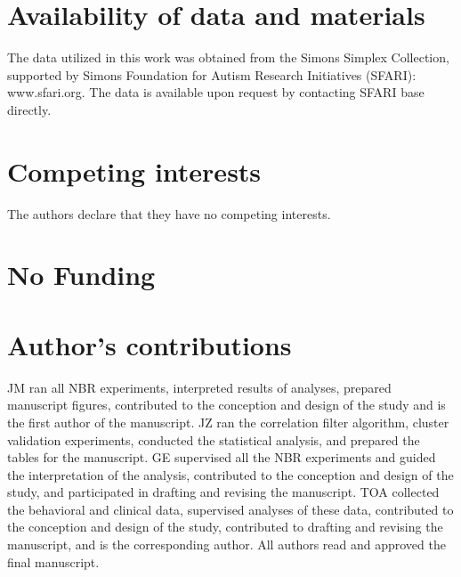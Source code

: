 \documentclass{bmcart}
\begin{document}
\begin{backmatter}
\section*{Availability of data and materials}
The data utilized in this work was obtained from the Simons Simplex Collection, supported by Simons Foundation for Autism Research Initiatives (SFARI): www.sfari.org. The data is available upon request by contacting SFARI base directly.  

\section*{Competing interests}
  The authors declare that they have no competing interests.


\section*{No Funding}
  

\section*{Author's contributions}
JM ran all NBR experiments, 
interpreted results of analyses, prepared manuscript figures, contributed to
the conception and design of the study and is the first author of the
manuscript. JZ ran the correlation filter algorithm, cluster validation experiments, conducted the statistical analysis, and prepared the tables for the manuscript. GE supervised all the NBR experiments and guided the interpretation of the analysis, contributed to the conception and design of the study, and participated in drafting and
revising the manuscript. TOA collected the behavioral and clinical data, supervised analyses of these data, contributed to the conception and design of the study, contributed to drafting and revising the manuscript, and is the corresponding author. All authors read and approved the
final manuscript.


\end{backmatter}
\end{document}
